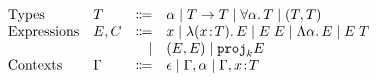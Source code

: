 \[
\begin{array}{llrl}
  \text{Types}       & T    & \Coloneqq & \alpha \mid T \to T \mid \forall \alpha. \, T \mid (T, T) \\ 
  \text{Expressions} & E, C & \Coloneqq & x \mid \lambda (x \!:\! T).\, E \mid E \; E \mid \Lambda \alpha.\, E \mid E \; T \\ 
                     &      & \mid      & (E, E) \mid {\texttt{proj}}_{k} E \\
  \text{Contexts} & \Gamma & \Coloneqq & \epsilon \mid \Gamma, \alpha \mid \Gamma, x \!:\! T \\
\end{array}
\]

